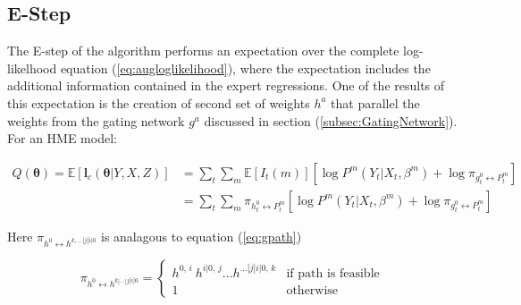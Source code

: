 \documentclass[12pt]{article}
\newcommand{\gateprod}[2]{\pi_{#1 \longleftrightarrow #2}}
\begin{document}


\subsection{E-Step}
The E-step of the algorithm performs an expectation over the complete
log-likelhood equation (\ref{eq:augloglikelihood}), where the expectation
includes the additional information contained in the expert regressions.
One of the results of this expectation is the creation of second set of
weights $h^{a}$ that parallel the weights from the gating network $g^{a}$
discussed in section (\ref{subsec:GatingNetwork}). For an HME model:

\begin{equation} \label{eq:Estep}
  \begin{split}
  Q(\boldsymbol{\theta}) = \mathbb{E} \left [ \boldsymbol{l}_{c}(\boldsymbol{\theta}|Y,X,Z) \right] & = \sum_{t}\sum_{m} \mathbb{E} \left[ I_{t}(m) \right] \left[ \log P^{m}(Y_{t}|X_{t}, \beta^{m}) + \log \gateprod{g^{0}_{t}}{P^{m}_{t}} \right] \\ 
   & = \sum_{t} \sum_{m} \gateprod{h^{0}_{t}}{P^{m}_{t}} \left[ \log P^{m}(Y_{t}|X_{t},\beta^{m}) + \log \gateprod{g^{0}_{t}}{P^{m}_{t}} \right]
 \end{split}
\end{equation}

Here $\gateprod{h^{0}}{h^{k,\dots|j|i|0}}$ is analagous to equation (\ref{eq:gpath})

\begin{equation} \label{eq:hpath}
  \gateprod{h^{0}}{h^{k|\ldots|j|i|0}} =
    \begin{cases} 
       h^{0, \, i} \ h^{i|0, \, j} \ldots h^{\dots|j|i|0, \, k} & \textrm{if path is feasible} \\
       1 & \textrm{otherwise}
    \end{cases}
\end{equation}
\end{document}
